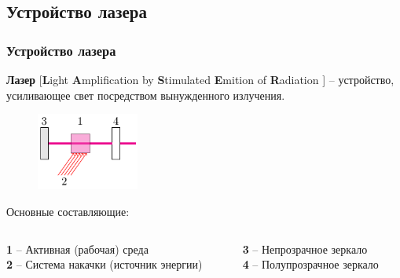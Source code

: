 \documentclass[10pt,pdf,hyperref={unicode}, dvipsnames]{beamer}
\newcommand\frametitless[1]{\subsection{#1}\frametitle{#1}}
\begin{document}
\begin{frame}[t] 
	\frametitless{Устройство лазера}
	\textbf{Лазер} [\textbf{L}ight \textbf{A}mplification by \textbf{S}timulated \textbf{E}mition of \textbf{R}adiation ] -- устройство, усиливающее свет посредством вынужденного излучения.

	\begin{figure}[h]
		\centering
		\includegraphics[width=0.3\textwidth]{images/las1}
	\end{figure}	




	Основные составляющие:
		\vspace{1em}
	\begin{columns}[t]
		\begin{column}{0.45\textwidth}
				\textbf{1} -- Активная (рабочая) среда\\
				\textbf{2} -- Система накачки (источник энергии)
		\end{column}
		\begin{column}{0.45\textwidth}
				\textbf{3} -- Непрозрачное зеркало\\
				\textbf{4} -- Полупрозрачное зеркало
		\end{column}
	\end{columns}
\end{frame}
\end{document}
